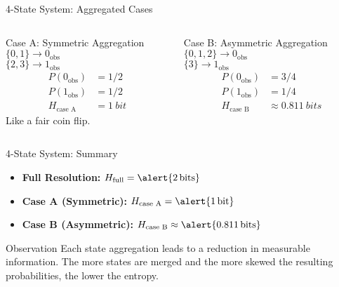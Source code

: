 \documentclass{beamer}
\newcommand{\Hfull}{H_{\text{full}}}
\newcommand{\HcaseA}{H_{\text{case A}}}
\newcommand{\HcaseB}{H_{\text{case B}}}
\newcommand{\obs}[1]{#1_{\text{obs}}} %
\begin{document}
\begin{frame}{4-State System: Aggregated Cases}
    \begin{columns}[T]
        \begin{column}{0.5\textwidth}
            \begin{block}{Case A: Symmetric Aggregation}
                $\{0, 1\} \to \obs{0}$ \\
                $\{2, 3\} \to \obs{1}$
                \pause
                \begin{align*}
                    P(\obs{0}) &= 1/2 \\
                    P(\obs{1}) &= 1/2 \\
                    \HcaseA &= \SI{1}{bit}
                \end{align*}
                \alert<3>{Like a fair coin flip.}
            \end{block}
        \end{column}
        \begin{column}{0.5\textwidth}
            \pause
            \begin{block}{Case B: Asymmetric Aggregation}
                $\{0, 1, 2\} \to \obs{0}$ \\
                $\{3\} \to \obs{1}$
                \pause
                \begin{align*}
                    P(\obs{0}) &= 3/4 \\
                    P(\obs{1}) &= 1/4 \\
                    \HcaseB &\approx \SI{0.811}{bits}
                \end{align*}
            \end{block}
        \end{column}
    \end{columns}
\end{frame}


\begin{frame}{4-State System: Summary}
    \begin{itemize}
        \item \textbf{Full Resolution:} $\Hfull = \alert{\SI{2}{bits}}$
        \item \textbf{Case A (Symmetric):} $\HcaseA = \alert{\SI{1}{bit}}$
        \item \textbf{Case B (Asymmetric):} $\HcaseB \approx \alert{\SI{0.811}{bits}}$
    \end{itemize}
    \pause
    \begin{block}{Observation}
        Each state aggregation leads to a \alert{reduction} in measurable information. The more states are merged and the more skewed the resulting probabilities, the lower the entropy.
    \end{block}
\end{frame}
\end{document}
